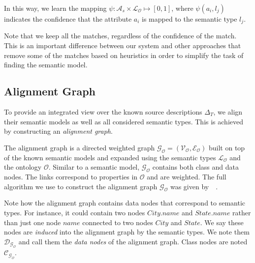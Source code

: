 \documentclass[letterpaper]{article} %
\newcommand{\authornote}[3]{
  {\fbox{\sc 
  #1}:$\blacktriangleright$\textcolor{#2}{\small{#3}}$\blacktriangleleft$}%
}
\newcommand{\ddg}[1]{\authornote{DDG}{blue}{#1}}
\newcommand{\npr}[1]{\authornote{NPR}{orange}{#1}}
\newcommand{\forijcai}[1]{}
\newcommand{\citeasnoun}[1]{\citeauthor{#1}~\shortcite{#1}}
\begin{document}
In this way, we learn the mapping $\psi : \mathcal{A}_s \times \mathcal{L_O} 
\mapsto [0, 1]$,
where $\psi(a_i,l_j)$ indicates the confidence that the attribute $a_i$ is 
mapped to the semantic type $l_j$.

Note that we keep all the matches, regardless of the confidence of the match. 
This is an important difference between our system and other approaches 
\cite{taheriyan2016learning} that 
remove some of the matches based on heuristics in order to simplify the task of 
finding the semantic model. 



\subsection{Alignment Graph}

To provide an integrated view over the known source descriptions $\Delta_T$, we 
align their semantic models as well as all considered semantic 
types. 
This is achieved by constructing an \emph{alignment graph}. 

The alignment graph is a directed weighted graph $\mathcal{G_O} = 
(\mathcal{V_O},\mathcal{E_O})$ built on top 
of the known semantic models and expanded using the semantic types 
$\mathcal{L_O}$ and the ontology $\mathcal{O}$. 
Similar to a semantic 
model, $\mathcal{G_O}$ contains both class and data nodes.
The links correspond 
to properties in  $\mathcal{O}$ and are weighted.
The full algorithm we use to construct the alignment graph 
$\mathcal{G_O}$ was given by~\citeasnoun{taheriyan2016learning}.
\forijcai{Briefly, it has three parts:
$(i)$ %
adding the known semantic models,
$(ii)$ %
adding the semantic types learned for the target source,
$(iii)$ expanding the graph using the domain ontology.
}

Note how the alignment graph contains data nodes that correspond to semantic types. 
For instance, it could contain two nodes $City.name$ and $State.name$ rather than just one node $name$ connected to two 
nodes $City$ and $State$. 
We say these nodes are \emph{induced} into the 
alignment graph by the semantic types.
We note them $\mathcal{D_{G_O}}$ and call them the \emph{data nodes} of the alignment graph.
Class nodes are noted $\mathcal{C_{G_O}}$.
\end{document}
